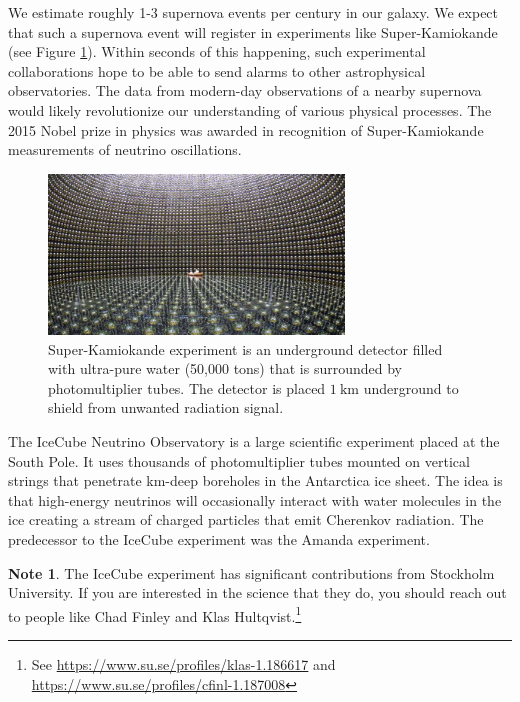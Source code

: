 \documentclass[a4paper,12pt]{article}
\theoremstyle{remark}
\newcommand{\mrm}[1]{\mathrm{#1}}
\renewcommand{\=}[1]{\stackrel{#1}{=}} %
\newcommand{\linkc}[1]{\textcolor{linkc}{#1}}
\theoremstyle{plain}
\theoremstyle{definition}
\newtheorem*{definitionT}{Note}%
\newenvironment{note}{
\begin{dBox}
\begin{definitionT}}
{\end{definitionT}
\end{dBox}}
\begin{document}
We estimate roughly 1-3 supernova events per century in our galaxy. We expect that such a supernova event will register in experiments like Super-Kamiokande (see Figure \ref{fig:skamiokande}). Within seconds of this happening, such experimental collaborations hope to be able to send alarms to other astrophysical observatories. The data from modern-day observations of a nearby supernova would likely revolutionize our understanding of various physical processes. The 2015 Nobel prize in physics was awarded in recognition of Super-Kamiokande measurements of neutrino oscillations. 

\begin{figure}[t]
\begin{center}
    \includegraphics*[angle=0,width=0.7\textwidth]{img/superkami.jpg}
    \caption[Super Kamiokande experiment]{Super-Kamiokande experiment is an underground detector filled with ultra-pure water (50,000 tons) that is surrounded by photomultiplier tubes. The detector is placed $1 \:\mrm{km}$ underground to shield from unwanted radiation signal.}
\label{fig:skamiokande}
\end{center}
\end{figure}

The IceCube Neutrino Observatory is a large scientific experiment placed at the South Pole. It uses thousands of photomultiplier tubes mounted on vertical strings that penetrate km-deep boreholes in the Antarctica ice sheet. The idea is that high-energy neutrinos will occasionally interact with water molecules in the ice creating a stream of charged particles that emit Cherenkov radiation. The predecessor to the IceCube experiment was the Amanda experiment.

\begin{note}
The IceCube experiment has significant contributions from Stockholm University. If you are interested in the science that they do, you should reach out to people like Chad Finley and Klas Hultqvist.\footnote{See \href{https://www.su.se/profiles/klas-1.186617}{\linkc{https://www.su.se/profiles/klas-1.186617}} and \href{https://www.su.se/profiles/cfinl-1.187008}{\linkc{https://www.su.se/profiles/cfinl-1.187008}}}
\end{note}
\end{document}
